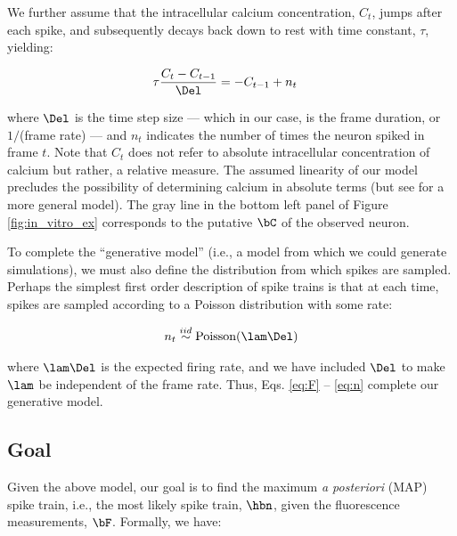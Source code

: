 We further assume that the intracellular calcium concentration, $C_t$, jumps after each spike, and subsequently decays back down to rest with time constant, $\tau$, yielding:


\begin{align} \label{eq:C}
\tau \frac{C_t - C_{t-1}}{\Del} &= - C_{t-1} + n_t
\end{align}

\noindent where $\Del$ is the time step size --- which in our case, is the frame duration, or $1/$(frame rate) --- and $n_t$ indicates the number of times the neuron spiked in frame $t$. %
Note that $C_t$ does not refer to absolute intracellular concentration of calcium but rather, a relative measure.  The assumed linearity of our model precludes the possibility of determining calcium in absolute terms (but see \cite{VogelsteinPaninski09} for a more general model).  The gray line in the bottom left panel of Figure \ref{fig:in_vitro_ex} corresponds to the putative $\bC$ of the observed neuron.  

To complete the ``generative model'' (i.e., a model from which we could generate simulations), we must also define the distribution from which spikes are sampled.  Perhaps the simplest first order description of spike trains is that at each time, spikes are sampled according to a Poisson distribution with some rate:

\begin{align} \label{eq:n}
	n_t \overset{iid}{\sim} \text{Poisson}(\lam \Del)
\end{align}

\noindent where $\lam \Del$ is the expected firing rate, and we have included $\Del$ to make $\lam$ be independent of the frame rate.  Thus, Eqs. \eqref{eq:F} -- \eqref{eq:n} complete our generative model.  






\subsection{Goal} \label{sec:goal}

Given the above model, our goal is to find the maximum \emph{a posteriori} (MAP) spike train, i.e., the most likely spike train, $\hbn$,  given the fluorescence measurements, $\bF$. Formally, we have:


